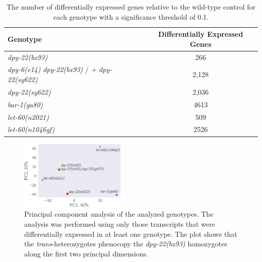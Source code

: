 \documentclass[9pt,twocolumn,twoside]{gsajnl}
\newcommand{\gene}[1]{\mbox{\emph{#1}}}
\newcommand{\dpy}[1]{\gene{dpy-22#1}}
\newcommand{\strongn}{2,036}
\newcommand{\weakn}{266}
\newcommand{\transn}{2,128}
\newcommand{\bx}{\dpy{(bx93)}}
\newcommand{\sy}{\dpy{(sy622)}}
\begin{document}
\begin{table}
 \centering
 \begin{tabular}{lc}
   \toprule
   Genotype & Differentially Expressed Genes\\
   \midrule
   \bx{} & \weakn{}\\
   \gene{dpy-6(e14)} \dpy{(bx93)} / \emph{+} \dpy{(sy622)} & \transn{}\\
   \sy{} & \strongn{}\\
   \gene{bar-1(ga80)} & 4613\\
   \gene{let-60(n2021)} & 509\\
   \gene{let-60(n1046gf)} & 2526\\
   \bottomrule
 \end{tabular}
 \caption{
          The number of differentially expressed genes relative to the wild-type
          control for each genotype with a significance threshold of 0.1.
          }
\label{tab:numbers}
\end{table}


\begin{figure}
  \centering{}
  \includegraphics[width=0.45\textwidth]{../figs/pca.pdf}
  \caption{
           Principal component analysis of the analyzed genotypes. The
           analysis was performed using only those transcripts that were
           differentially expressed in at least one genotype. The plot shows
           that the \emph{trans}-heterozygotes phenocopy the \bx{} homozygotes
           along the first two principal dimensions.
           }
\label{fig:pca}
\end{figure}
\end{document}
